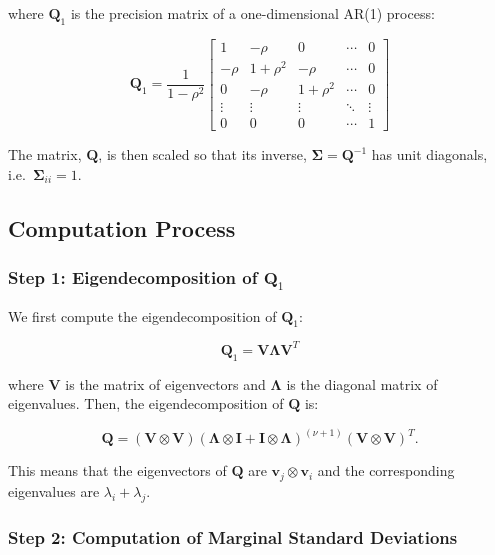 \documentclass[journal=,manuscript=]{achemso}
\begin{document}
where \(\mathbf{Q}_1\) is the precision matrix of a one-dimensional
AR(1) process:

\[
\mathbf{Q}_1 = \frac{1}{1-\rho^2}
\begin{bmatrix}
1 & -\rho & 0 & \cdots & 0 \\
-\rho & 1+\rho^2 & -\rho & \cdots & 0 \\
0 & -\rho & 1+\rho^2 & \cdots & 0 \\
\vdots & \vdots & \vdots & \ddots & \vdots \\
0 & 0 & 0 & \cdots & 1
\end{bmatrix}
\]

The matrix, \(\mathbf Q\), is then scaled so that its inverse,
\(\mathbf \Sigma = \mathbf Q^{-1}\) has unit diagonals,
i.e.~\(\mathbf \Sigma_{ii} = 1\).

\subsection{Computation Process}\label{computation-process}

\subsubsection{\texorpdfstring{Step 1: Eigendecomposition of
\(\mathbf{Q}_1\)}{Step 1: Eigendecomposition of \textbackslash mathbf\{Q\}\_1}}\label{step-1-eigendecomposition-of-mathbfq_1}

We first compute the eigendecomposition of \(\mathbf{Q}_1\):

\[
\mathbf{Q}_1 = \mathbf{V}\mathbf{\Lambda}\mathbf{V}^T
\]

where \(\mathbf{V}\) is the matrix of eigenvectors and
\(\mathbf{\Lambda}\) is the diagonal matrix of eigenvalues. Then, the
eigendecomposition of \(\mathbf{Q}\) is:

\[
\mathbf{Q} = (\mathbf{V} \otimes \mathbf{V})(\mathbf{\Lambda} \otimes \mathbf{I} + \mathbf{I} \otimes \mathbf{\Lambda})^{(\nu + 1)}(\mathbf{V} \otimes \mathbf{V})^T.
\]

This means that the eigenvectors of \(\mathbf{Q}\) are
\(\mathbf{v}_j \otimes \mathbf{v}_i\) and the corresponding eigenvalues
are \(\lambda_i + \lambda_j\).

\subsubsection{Step 2: Computation of Marginal Standard
Deviations}\label{step-2-computation-of-marginal-standard-deviations}
\end{document}
